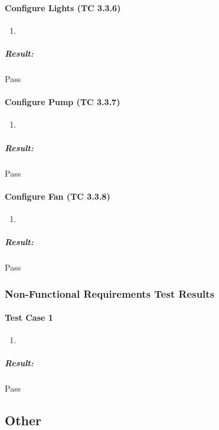 \documentclass{article}
\begin{document}
			\paragraph{Configure Lights (TC 3.3.6)}
				\begin{enumerate}
					\item 
				\end{enumerate}
				\subparagraph{Result: } Pass
				
			\paragraph{Configure Pump (TC 3.3.7)}
				\begin{enumerate}
					\item 
				\end{enumerate}
				\subparagraph{Result: } Pass
				
			\paragraph{Configure Fan (TC 3.3.8)}
				\begin{enumerate}
					\item 
				\end{enumerate}
				\subparagraph{Result: } Pass
			
		\subsubsection{Non-Functional Requirements Test Results}
			\paragraph{Test Case 1}
				\begin{enumerate}
					\item 
				\end{enumerate}
				\subparagraph{Result: } Pass
	\subsection{Other}
\end{document}
